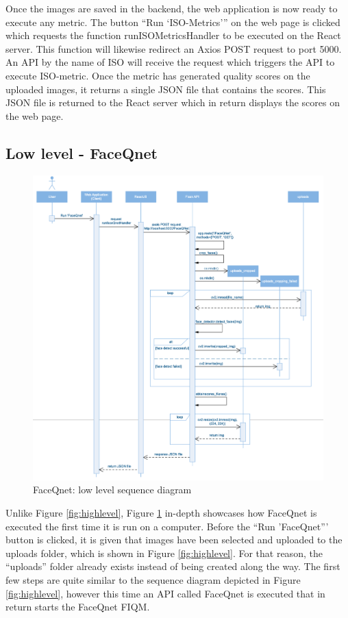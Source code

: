 Once the images are saved in the backend, the web application is now ready to execute any metric. The button ``Run `ISO-Metrics''' on the web page is clicked which requests the function runISOMetricsHandler to be executed on the React server. This function will likewise redirect an Axios POST request to port 5000. An API by the name of ISO will receive the request which triggers the API to execute ISO-metric. Once the metric has generated quality scores on the uploaded images, it returns a single JSON file that contains the scores. This JSON file is returned to the React server which in return displays the scores on the web page. 
\newpage

\subsection{Low level - FaceQnet}

\begin{figure}[h]
    \centering
    \includegraphics[scale = 0.55]{figures/FerdigLowLevel.png}
    \caption{FaceQnet: low level sequence diagram}
    \label{fig:lowlevel}
\end{figure}

Unlike Figure \ref{fig:highlevel}, Figure \ref{fig:lowlevel} in-depth showcases how FaceQnet is executed the first time it is run on a computer. Before the ``Run 'FaceQnet''' button is clicked, it is given that images have been selected and uploaded to the uploads folder, which is shown in Figure \ref{fig:highlevel}. For that reason, the ``uploads'' folder already exists instead of being created along the way. The first few steps are quite similar to the sequence diagram depicted in Figure \ref{fig:highlevel}, however this time an API called FaceQnet is executed that in return starts the FaceQnet FIQM. 
\newpage


